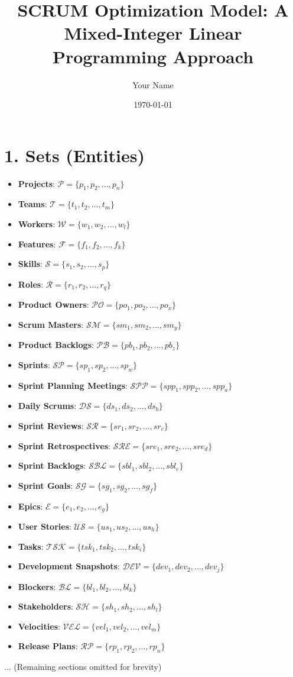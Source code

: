 \documentclass[12pt]{article}
\title{SCRUM Optimization Model: A Mixed-Integer Linear Programming Approach}
\author{Your Name}
\date{\today}
\begin{document}
\maketitle
\tableofcontents

\section{1. Sets (Entities)}
\begin{itemize}
    \item \textbf{Projects}: $\mathcal{P} = \{p_1, p_2, ..., p_n\}$
    \item \textbf{Teams}: $\mathcal{T} = \{t_1, t_2, ..., t_m\}$
    \item \textbf{Workers}: $\mathcal{W} = \{w_1, w_2, ..., w_l\}$
    \item \textbf{Features}: $\mathcal{F} = \{f_1, f_2, ..., f_k\}$
    \item \textbf{Skills}: $\mathcal{S} = \{s_1, s_2, ..., s_p\}$
    \item \textbf{Roles}: $\mathcal{R} = \{r_1, r_2, ..., r_q\}$
    \item \textbf{Product Owners}: $\mathcal{PO} = \{po_1, po_2, ..., po_x\}$
    \item \textbf{Scrum Masters}: $\mathcal{SM} = \{sm_1, sm_2, ..., sm_y\}$
    \item \textbf{Product Backlogs}: $\mathcal{PB} = \{pb_1, pb_2, ..., pb_z\}$
    \item \textbf{Sprints}: $\mathcal{SP} = \{sp_1, sp_2, ..., sp_w\}$
    \item \textbf{Sprint Planning Meetings}: $\mathcal{SPP} = \{spp_1, spp_2, ..., spp_a\}$
    \item \textbf{Daily Scrums}: $\mathcal{DS} = \{ds_1, ds_2, ..., ds_b\}$
    \item \textbf{Sprint Reviews}: $\mathcal{SR} = \{sr_1, sr_2, ..., sr_c\}$
    \item \textbf{Sprint Retrospectives}: $\mathcal{SRE} = \{sre_1, sre_2, ..., sre_d\}$
    \item \textbf{Sprint Backlogs}: $\mathcal{SBL} = \{sbl_1, sbl_2, ..., sbl_e\}$
    \item \textbf{Sprint Goals}: $\mathcal{SG} = \{sg_1, sg_2, ..., sg_f\}$
    \item \textbf{Epics}: $\mathcal{E} = \{e_1, e_2, ..., e_g\}$
    \item \textbf{User Stories}: $\mathcal{US} = \{us_1, us_2, ..., us_h\}$
    \item \textbf{Tasks}: $\mathcal{TSK} = \{tsk_1, tsk_2, ..., tsk_i\}$
    \item \textbf{Development Snapshots}: $\mathcal{DEV} = \{dev_1, dev_2, ..., dev_j\}$
    \item \textbf{Blockers}: $\mathcal{BL} = \{bl_1, bl_2, ..., bl_k\}$
    \item \textbf{Stakeholders}: $\mathcal{SH} = \{sh_1, sh_2, ..., sh_l\}$
    \item \textbf{Velocities}: $\mathcal{VEL} = \{vel_1, vel_2, ..., vel_m\}$
    \item \textbf{Release Plans}: $\mathcal{RP} = \{rp_1, rp_2, ..., rp_n\}$
\end{itemize}

... (Remaining sections omitted for brevity)
\end{document}
